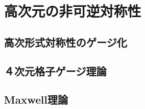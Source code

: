 \documentclass[generalized_symmetry.tex]{subfiles}
\begin{document}
\chapter{高次元の非可逆対称性}
\section{高次形式対称性のゲージ化}
\section{４次元\texorpdfstring{\Ztwo}{Z2}格子ゲージ理論}
\section{Maxwell理論}
\end{document}
